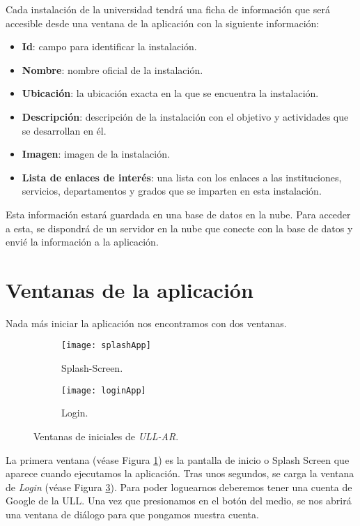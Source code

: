 Cada instalación de la universidad tendrá una ficha de información que será accesible desde una ventana de la aplicación con la siguiente información:

\begin{itemize}
    \item \textbf{Id}: campo para identificar la instalación.
    \item \textbf{Nombre}: nombre oficial de la instalación.
    \item \textbf{Ubicación}: la ubicación exacta en la que se encuentra la instalación. 
    \item \textbf{Descripción}: descripción de la instalación con el objetivo y actividades que se desarrollan en él.
    \item \textbf{Imagen}: imagen de la instalación.
    \item \textbf{Lista de enlaces de interés}: una lista con los enlaces a las instituciones, servicios, departamentos y grados que se imparten en esta instalación.
\end{itemize}

Esta información estará guardada en una base de datos en la nube. Para acceder a esta, se dispondrá de un servidor en la nube que conecte con la base de datos y envié la información a la aplicación.

\section{Ventanas de la aplicación}

Nada más iniciar la aplicación nos encontramos con dos ventanas.

\begin{figure}[h]
\hspace*{\fill}%
\begin{subfigure}[h]{0.32\linewidth}
\texttt{[image: splashApp]}
\caption{Splash-Screen.}
\label{fig:splashApp}
\end{subfigure}
\hfill%
\begin{subfigure}[h]{0.32\linewidth}
\texttt{[image: loginApp]}
\caption{Login.}
\label{fig:loginApp} 
\end{subfigure}%
\caption{Ventanas de iniciales de \textit{ULL-AR}.}
\hspace*{\fill}%
\end{figure}
  
La primera ventana (véase Figura \ref{fig:splashApp}) es la pantalla de inicio o Splash Screen que aparece cuando ejecutamos la aplicación. Tras unos segundos, se carga la ventana de \textit{Login} (véase Figura \ref{fig:loginApp}). Para poder loguearnos deberemos tener una cuenta de Google de la ULL. Una vez que presionamos en el botón del medio, se nos abrirá una ventana de diálogo para que pongamos nuestra cuenta.

